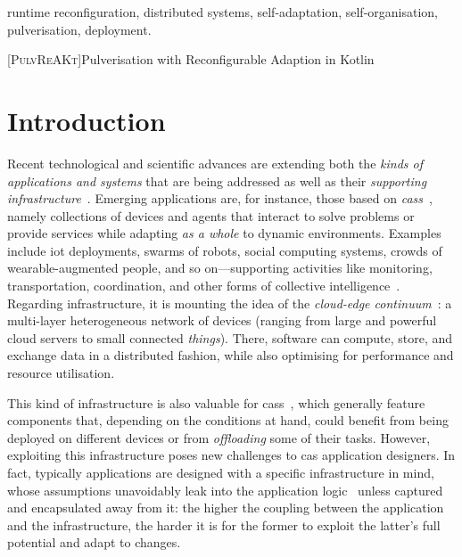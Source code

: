 \documentclass[conference]{IEEEtran}
\newcommand{\meta}[1]{{\color{blue}#1}}
\begin{document}
\begin{IEEEkeywords}
runtime reconfiguration, distributed systems, self-adaptation, self-organisation, pulverisation, deployment.
\end{IEEEkeywords}

[\textsc{PulvReAKt}]{Pulverisation with Reconfigurable Adaption in Kotlin}
\newcommand{\ourframework}{\ac{ourframework}}


\section{Introduction}\label{sec:introduction}

Recent technological and scientific advances
 are extending 
 both the \emph{kinds of applications and systems} that are being addressed  
 as well as their \emph{supporting infrastructure}~\cite{DBLP:journals/iot/GillXOPBSGSWASM22}.
%
Emerging applications
 are, for instance, those based on \emph{\acp{cas}}~\cite{DBLP:journals/computer/Abowd16,DBLP:journals/sttt/NicolaJW20},
 namely collections of devices and agents
 that interact to solve problems or provide services while adapting \emph{as a whole} to dynamic environments.
%
Examples include 
  \ac{iot} deployments, 
  swarms of robots,
  social computing systems,
  crowds of wearable-augmented people, and so on---supporting activities like monitoring,
  transportation, coordination, and other forms of collective intelligence~\cite{casadei2023artl-ci}.
%
Regarding infrastructure,
 it is mounting the idea of the \emph{cloud-edge continuum}~\cite{DBLP:journals/iot/BittencourtISFM18}: 
a multi-layer heterogeneous network of devices (ranging from large and powerful cloud servers to small connected \emph{things}).
There, software can compute, store, and exchange data in a distributed fashion, while also 
optimising for performance and resource utilisation.
%

This kind of infrastructure is also valuable for  \acp{cas}~\cite{DBLP:journals/tpds/HongCHGZ19,DBLP:journals/comsur/WangZZMLW20,DBLP:journals/comsur/AfrinJRRWH21,IEEE-IoTJ-pulverization-simulation},
which generally feature components that,
depending on the conditions at hand,
could benefit from being deployed on different devices or from \emph{offloading} some of their  tasks.
%
However, exploiting this infrastructure
 poses new challenges to \ac{cas} application designers.
%
In fact, typically applications are designed with a specific infrastructure in mind,
whose assumptions unavoidably leak into the application logic~\cite{Spolsky2004}
unless captured and encapsulated away from it:
the higher the coupling between the application and the infrastructure,
the harder it is for the former to exploit the latter's full potential and adapt to changes.
    
\end{document}
